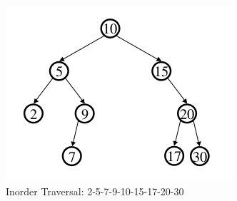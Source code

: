 \documentclass[a4paper,10pt]{report}
\begin{document}
\begin{figure}[h!]
	\begin{centering}
	\begin{center}
	\includegraphics[width=\linewidth]{./Pictures/Inorder.png}
	\caption{Inorder Traversal: 2-5-7-9-10-15-17-20-30}
	\label{fig:??????}
	\end{center}
	\par\end{centering}
\end{figure}








%
%
\end{document}
